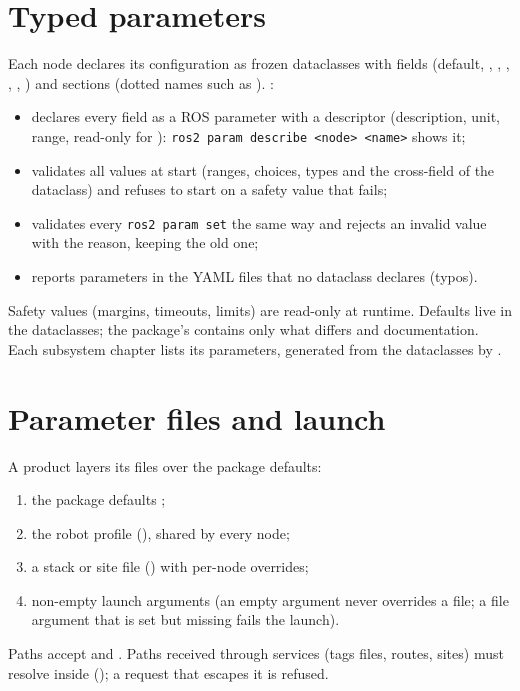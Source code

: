 \section{Typed parameters}

Each node declares its configuration as frozen dataclasses with
 fields (default, , , , , , )
and  sections (dotted names such as ). :
\begin{itemize}
  \item declares every field as a ROS parameter with a descriptor (description, unit, range,
    read-only for ): \texttt{ros2 param describe <node> <name>} shows it;
  \item validates all values at start (ranges, choices, types and the cross-field
     of the dataclass) and refuses to start on a safety value that fails;
  \item validates every \texttt{ros2 param set} the same way and rejects an invalid value with
    the reason, keeping the old one;
  \item reports parameters in the YAML files that no dataclass declares (typos).
\end{itemize}

Safety values (margins, timeouts, limits) are read-only at runtime. Defaults live in the
dataclasses; the package's  contains only what differs and
documentation. Each subsystem chapter lists its parameters, generated from the dataclasses by
.

\section{Parameter files and launch}
\label{sec:launch}

A product layers its files over the package defaults:
\begin{enumerate}
  \item the package defaults ;
  \item the robot profile (), shared by every node;
  \item a stack or site file () with per-node overrides;
  \item non-empty launch arguments (an empty argument never overrides a file; a file argument
    that is set but missing fails the launch).
\end{enumerate}

Paths accept \code{~} and . Paths received through services (tags files, routes,
sites) must resolve inside  (); a request
that escapes it is refused.
